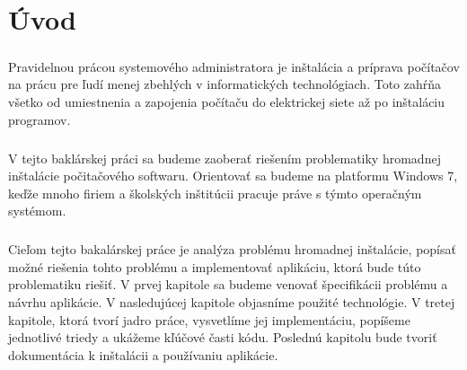 \chapter*{Úvod}
\paragraph{}
Pravidelnou prácou systemového administratora je inštalácia a príprava počítačov na prácu pre ľudí menej zbehlých v informatických technológiach. Toto zahŕňa všetko od umiestnenia a zapojenia počítaču do elektrickej siete až po inštaláciu programov.

\paragraph{}
V tejto baklárskej práci sa budeme zaoberať riešením problematiky hromadnej inštalácie počitačového softwaru. Orientovať sa budeme na platformu Windows 7, keďže mnoho firiem a školských inštitúcii pracuje práve s týmto operačným systémom.

\paragraph{}
Cieľom tejto bakalárskej práce je analýza problému hromadnej inštalácie, popísať možné riešenia tohto problému a implementovať aplikáciu, ktorá bude túto problematiku riešiť. 
V prvej kapitole sa budeme venovať špecifikácii problému a návrhu aplikácie. V nasledujúcej kapitole objasníme použité technológie. V tretej kapitole, ktorá tvorí jadro práce, vysvetlíme jej implementáciu, popíšeme jednotlivé triedy a ukážeme kľúčové časti kódu. Poslednú kapitolu bude tvoriť dokumentácia k inštalácii a používaniu aplikácie.

